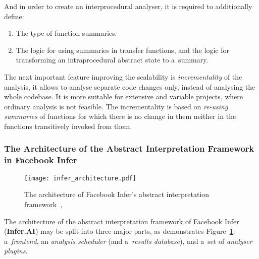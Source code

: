 And in order to create an interprocedural analyser, it is required to
additionally define:
\begin{enumerate}
    \item 
        The type of function summaries.
        
    \item
        The logic for using summaries in transfer functions, and the logic
        for transforming an intraprocedural abstract state to
        a~summary.
\end{enumerate}
The next important feature improving the scalability is 
\emph{incrementality} of the analysis, it allows to analyse separate
code changes only, instead of analysing the whole codebase. It is more 
suitable for extensive and variable projects, where ordinary analysis 
is not feasible. The incrementality is based on \emph{re-using summaries} 
of functions for which there is no change in them neither in the functions
transitively invoked from them.

\subsubsection*{
    The Architecture of the Abstract Interpretation Framework in 
    Facebook Infer
}

\begin{figure}[hbt]
    \centering
    \texttt{[image: infer\_architecture.pdf]}
    \caption{
        The architecture of Facebook Infer's abstract interpretation 
        framework~\cite{inferAISlides}, \cite{projectPracticeMarcin2018}
    }
    \label{fig:inferArchitecture}
\end{figure}

The architecture of the abstract interpretation framework of Facebook
Infer (\textbf{Infer.AI}) may be split into three major parts,
as demonstrates Figure~\ref{fig:inferArchitecture}: a~\emph{frontend},
an \emph{analysis scheduler} (and a~\emph{results database}), and a~set of 
\emph{analyser plugins}. 


